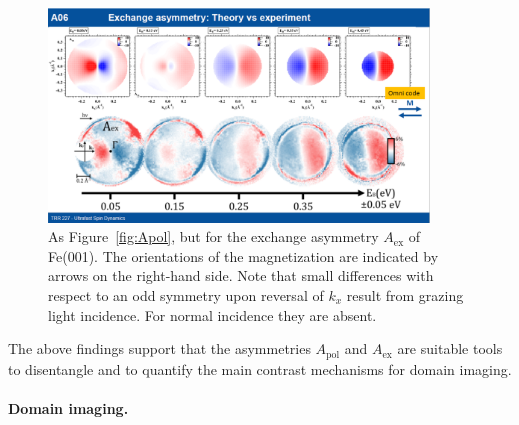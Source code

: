 \documentclass[prl,twocolumn,floatfix]{revtex4-2}
\begin{document}
\begin{figure}
    \centering
    \includegraphics[width = 0.9\textwidth]{Aex}
    \caption{As Figure~\ref{fig:Apol}, but for the exchange asymmetry $A_{\mathrm{ex}}$ of Fe(001). The orientations of the magnetization are indicated by arrows on the right-hand side. Note that small differences with respect to an odd symmetry upon reversal of $k_{x}$ result from grazing light incidence. For normal incidence they are absent.}
    \label{fig:Aex}
\end{figure}

The above findings support that the asymmetries $A_{\mathrm{pol}}$ and $A_{\mathrm{ex}}$ are suitable tools to disentangle and to quantify the main contrast mechanisms for domain imaging. 

\paragraph{Domain imaging.} 
\end{document}
